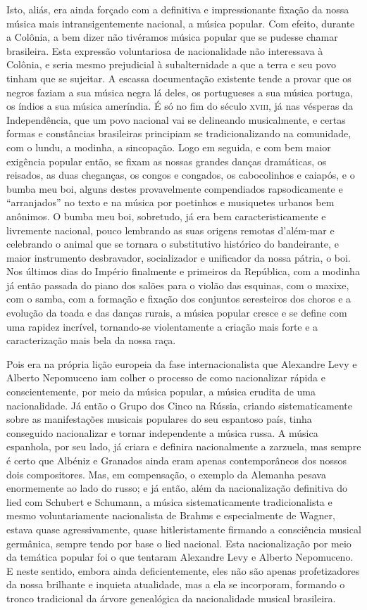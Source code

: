 Isto, aliás, era ainda forçado com a definitiva e impressionante fixação
da nossa música mais intransigentemente nacional, a música popular. Com
efeito, durante a Colônia, a bem dizer não tivéramos música popular que
se pudesse chamar brasileira. Esta expressão voluntariosa de
nacionalidade não interessava à Colônia, e seria mesmo prejudicial à
subalternidade a que a terra e seu povo tinham que se sujeitar. A
escassa documentação existente tende a provar que os negros faziam a sua
música negra lá deles, os portugueses a sua música portuga, os índios a
sua música ameríndia. É só no fim do século \textsc{xviii}, já nas vésperas da
Independência, que um povo nacional vai se delineando musicalmente, e
certas formas e constâncias brasileiras principiam se tradicionalizando
na comunidade, com o lundu, a modinha, a sincopação. Logo em seguida, e
com bem maior exigência popular então, se fixam as nossas grandes danças
dramáticas, os reisados, as duas cheganças, os congos e congados, os
cabocolinhos e caiapós, e o bumba meu boi, alguns destes provavelmente
compendiados rapsodicamente e ``arranjados'' no texto e na música por
poetinhos e musiquetes urbanos bem anônimos. O bumba meu boi, sobretudo,
já era bem caracteristicamente e livremente nacional, pouco lembrando as
suas origens remotas d'além-mar e celebrando o animal que se tornara o
substitutivo histórico do bandeirante, e maior instrumento desbravador,
socializador e unificador da nossa pátria, o boi. Nos últimos dias do
Império finalmente e primeiros da República, com a modinha já então
passada do piano dos salões para o violão das esquinas, com o maxixe,
com o samba, com a formação e fixação dos conjuntos seresteiros dos
choros e a evolução da toada e das danças rurais, a música popular
cresce e se define com uma rapidez incrível, tornando-se violentamente a
criação mais forte e a caracterização mais bela da nossa raça.

Pois era na própria lição europeia da fase internacionalista que
Alexandre Levy e Alberto Nepomuceno iam colher o processo de como
nacionalizar rápida e conscientemente, por meio da música popular, a
música erudita de uma nacionalidade. Já então o Grupo dos Cinco na
Rússia, criando sistematicamente sobre as manifestações musicais
populares do seu espantoso país, tinha conseguido nacionalizar e tornar
independente a música russa. A música espanhola, por seu lado, já criara
e definira nacionalmente a zarzuela, mas sempre é certo que Albéniz e
Granados ainda eram apenas contemporâneos dos nossos dois compositores.
Mas, em compensação, o exemplo da Alemanha pesava enormemente ao lado do
russo; e já então, além da nacionalização definitiva do lied com
Schubert e Schumann, a música sistematicamente tradicionalista e mesmo
voluntariamente nacionalista de Brahms e especialmente de Wagner, estava
quase agressivamente, quase hitleristamente firmando a consciência
musical germânica, sempre tendo por base o lied nacional. Esta
nacionalização por meio da temática popular foi o que tentaram Alexandre
Levy e Alberto Nepomuceno. E neste sentido, embora ainda
deficientemente, eles não são apenas profetizadores da nossa brilhante e
inquieta atualidade, mas a ela se incorporam, formando o tronco
tradicional da árvore genealógica da nacionalidade musical brasileira.


